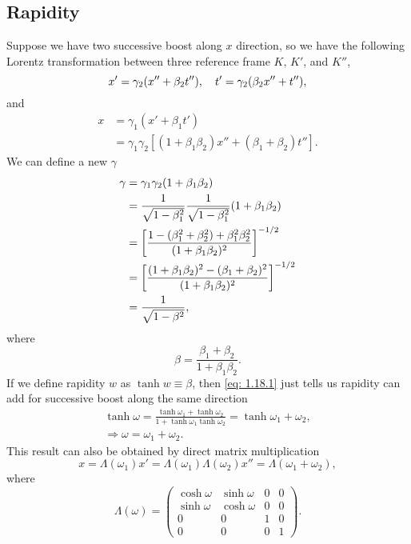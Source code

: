 \documentclass[10pt]{article}
\begin{document}
\subsection{Rapidity}
Suppose we have two successive boost along $x$ direction, so we have the following Lorentz transformation between three reference frame $K$, $K'$, and $K''$,
\begin{equation}
	x' = \gamma_2(x'' + \beta_2 t'')\qc t' = \gamma_2(\beta_2 x'' + t''),
\end{equation}
and
\begin{align*}
	x &= \gamma_1 (x' + \beta_1 t') \\
	&= \gamma_1 \gamma_2 [(1+\beta_1\beta_2) x'' + (\beta_1 + \beta_2)t''].
\end{align*}
We can define a new $\gamma$
\begin{align*}
	\gamma &= \gamma_1 \gamma_2 (1+ \beta_1\beta_2) \\
	&= \frac{1}{\sqrt{1-\beta_1^2}} \frac{1}{\sqrt{1-\beta_1^2}} (1+ \beta_1\beta_2) \\
	&= \qty[\frac{1-(\beta_1^2+\beta_2^2) + \beta_1^2\beta_2^2}{(1+ \beta_1\beta_2)^2}]^{-1/2} \\
	&= \qty[\frac{(1+ \beta_1\beta_2)^2 - (\beta_1 + \beta_2)^2}{(1+ \beta_1\beta_2)^2}]^{-1/2} \\
	&= \frac{1}{\sqrt{1-\beta^2}},
\end{align*}
where
\begin{equation}
	\beta = \frac{\beta_1 + \beta_2}{1+ \beta_1\beta_2}. \label{eq: 1.18.1}
\end{equation}
If we define rapidity $w$ as $\tanh{w} \equiv \beta$, then \eqref{eq: 1.18.1} just tells us rapidity can add for successive boost along the same direction
\begin{gather}
	\tanh{\omega} = \frac{\tanh{\omega_1} + \tanh{\omega_2}}{1+ \tanh{\omega_1}\tanh{\omega_2}} = \tanh{\omega_1 + \omega_2}, \\
	\Longrightarrow \omega = \omega_1 + \omega_2.
\end{gather}
This result can also be obtained by direct matrix multiplication
\begin{equation}
	x = \Lambda(\omega_1) x' = \Lambda(\omega_1) \Lambda(\omega_2) x'' = \Lambda(\omega_1 + \omega_2),
\end{equation}
where
\begin{equation}
	\Lambda(\omega) =
	\begin{pmatrix}
		\cosh{\omega} & \sinh{\omega} &0 &0 \\
		\sinh{\omega} & \cosh{\omega} &0 &0 \\
		0 &0 &1 &0 \\
		0 &0 &0 &1
	\end{pmatrix}.
\end{equation}
\end{document}
